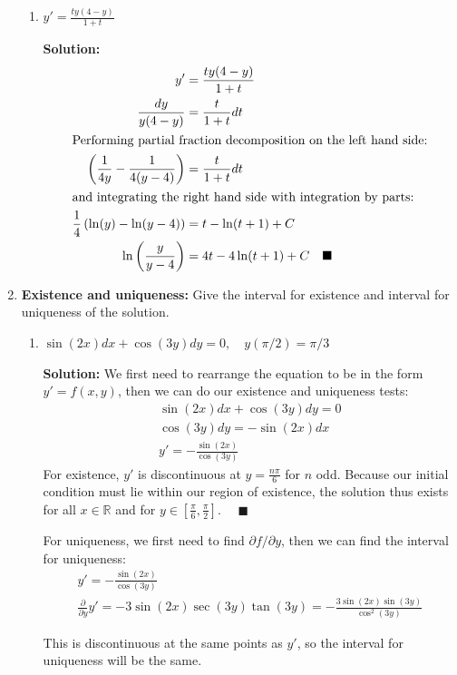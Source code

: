 \documentclass[letterpaper, fontsize=11pt]{scrartcl} %
\numberwithin{equation}{section} %
\numberwithin{figure}{section} %
\numberwithin{table}{section} %
\begin{document}
\begin{enumerate}
\begin{enumerate}
\item $y' =\frac{ty(4-y)}{1+t}$
\par \textbf{Solution:}
\begin{align*}
y' &= \frac{ty(4-y)}{1+t}\\
\frac{dy}{y(4-y)} &= \frac{t}{1+t}dt\\
\intertext{Performing partial fraction decomposition on the left hand side:}
\left( \frac{1}{4y} - \frac{1}{4(y-4)} \right) &= \frac{t}{1+t}dt\\
\intertext{and integrating the right hand side with integration by parts:}
\frac{1}{4}\left( \ln(y) - \ln(y-4)\right) &= t - \ln(t+1) + C\\
\ln\left(\frac{y}{y-4}\right) &= 4t - 4\ln(t+1) + C\quad\blacksquare
\end{align*}

\end{enumerate}

\item \textbf{Existence and uniqueness:} Give the interval for existence and interval for uniqueness of the solution. 
\begin{enumerate}

\item $\sin(2x)dx+\cos(3y)dy=0, \quad y(\pi/2) = \pi/3$
\par \textbf{Solution:} We first need to rearrange the equation to be in the form $y' = f(x,y)$, then we can do our existence and uniqueness tests:
\begin{gather*}
\sin(2x)dx+\cos(3y)dy=0 \\
\cos(3y)dy = -\sin(2x)dx\\
y' = -\frac{\sin(2x)}{\cos(3y)}
\end{gather*}
For existence, $y'$ is discontinuous at $y = \frac{n\pi}{6}$ for $n$ odd. Because our initial condition must lie within our region of existence, the solution thus exists for all $x \in \mathbb{R}$ and for $y \in [\frac{\pi}{6},\frac{\pi}{2}]$. $\quad\blacksquare$
\par For uniqueness, we first need to find $\partial f /\partial y$, then we can find the interval for uniqueness:
\begin{gather*}
y' = -\frac{\sin(2x)}{\cos(3y)}\\
\frac{\partial}{\partial y}y' = -3\sin(2x)\sec(3y)\tan(3y) = -\frac{3\sin(2x)\sin(3y)}{\cos^2(3y)}
\end{gather*}
\par This is discontinuous at the same points as $y'$, so the interval for uniqueness will be the same. 


\end{enumerate}
\end{enumerate}
\end{document}
